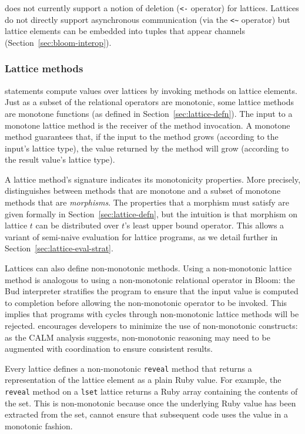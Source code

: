 \lang does not currently support a notion of deletion (\verb|<-| operator) for
lattices. Lattices do not directly support asynchronous communication (via the
\verb|<~| operator) but lattice elements can be embedded into tuples that appear
channels (Section~\ref{sec:bloom-interop}).

\subsubsection{Lattice methods}
\lang statements compute values over lattices by invoking methods on lattice
elements. Just as a subset of the relational operators are monotonic, some
lattice methods are monotone functions (as defined in
Section~\ref{sec:lattice-defn}). 
The input to a monotone lattice method is the
receiver of the method invocation. A monotone method guarantees that, if the
input to the method grows (according to the input's lattice type), the value
returned by the method will grow (according to the result value's lattice
type).

A lattice method's signature indicates its monotonicity properties. More
precisely, \lang distinguishes between methods that are monotone and a subset of
monotone methods that are \emph{morphisms}. The properties that a morphism must
satisfy are given formally in Section~\ref{sec:lattice-defn}, but the intuition
is that morphism on lattice $t$ can be distributed over $t$'s least upper bound
operator. This allows a variant of semi-naive evaluation for lattice programs,
as we detail further in Section~\ref{sec:lattice-eval-strat}.

Lattices can also define non-monotonic methods. Using a non-monotonic lattice
method is analogous to using a non-monotonic relational operator in Bloom: the
Bud interpreter stratifies the program to ensure that the input value is
computed to completion before allowing the non-monotonic operator to be invoked. This
implies that programs with cycles through non-monotonic lattice methods will be
rejected. \lang encourages developers to minimize the use of non-monotonic
constructs: as the CALM analysis suggests, non-monotonic reasoning may need to
be augmented with coordination to ensure consistent results.

Every lattice defines a non-monotonic \texttt{reveal} method that returns a
representation of the lattice element as a plain Ruby value. For example, the
\texttt{reveal} method on a \texttt{lset} lattice returns a Ruby array
containing the contents of the set. This is non-monotonic because once the
underlying Ruby value has been extracted from the set, \lang cannot ensure that
subsequent code uses the value in a monotonic fashion.

